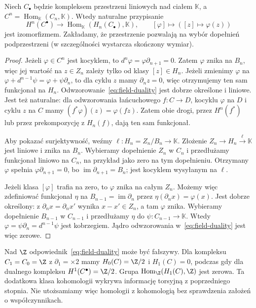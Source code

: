 \begin{twierdzenie}
\label{thm:field-hom-dual}
Niech $C_\bullet$ będzie kompleksem
przestrzeni liniowych nad ciałem
$\mathbb K$, a
$C^n=\operatorname{Hom}_{\mathbb K}(C_n,\mathbb K)$.
Wtedy naturalne przypisanie
\begin{equation}\label{eq:field-duality}
 H^n(C^\bullet)
 \longrightarrow\operatorname{Hom}_{\mathbb K}
  (H_n(C_\bullet),\mathbb K),
 \qquad [\varphi]\longmapsto
     ([z]\longmapsto\varphi(z))
\end{equation}
jest izomorfizmem. Zakładamy, że
przestrzenie pozwalają na wybór
dopełnień podprzestrzeni
(w szczególności wystarcza skończony wymiar).
\end{twierdzenie}
\begin{proof}
Jeżeli $\varphi\in C^n$ jest kocyklem,
to $d^n\varphi=\varphi \partial_{n+1}=0$.
Zatem $\varphi$ znika na $B_n$,
więc jej wartość na $z\in Z_n$
zależy tylko od klasy $[z]\in H_n$.
Jeżeli zmienimy $\varphi$ na
$\varphi+d^{n-1}\psi
=\varphi+\psi \partial_n$, to dla cyklu $z$
mamy $\partial_nz=0$, więc otrzymujemy
ten sam funkcjonał na $H_n$.
Odwzorowanie~\eqref{eq:field-duality} jest
dobrze określone i liniowe. Jest też naturalne: dla odwzorowania
łańcuchowego $f:C\to D$, kocyklu $\varphi$ na $D$ i cyklu $z$ na $C$
mamy $(f^*\varphi)(z)=\varphi(fz)$. Zatem obie drogi, przez
$H^n(f^*)$ lub przez prekompozycję z $H_n(f)$, dają ten sam funkcjonał.

Aby pokazać surjektywność, weźmy
$\ell:H_n=Z_n/B_n\to\mathbb K$.
Złożenie $Z_n\to H_n\xrightarrow{\ell}\mathbb K$
jest liniowe i znika na $B_n$.
Wybieramy dopełnienie $Z_n$ w $C_n$
i przedłużamy funkcjonał liniowo
na $C_n$, na przykład jako zero
na tym dopełnieniu. Otrzymany
$\varphi$ spełnia
$\varphi \partial_{n+1}=0$, bo
$\operatorname{im}\partial_{n+1}=B_n$;
jest kocyklem wysyłanym na $\ell$.

Jeżeli klasa $[\varphi]$ trafia na zero,
to $\varphi$ znika na całym $Z_n$.
Możemy więc zdefiniować funkcjonał
$\eta$ na $B_{n-1}=\operatorname{im}\partial_n$
przez $\eta(\partial_nx)=\varphi(x)$.
Jest dobrze określony: z
$\partial_nx=\partial_nx'$ wynika $x-x'\in Z_n$,
a tam $\varphi$ znika.
Wybieramy dopełnienie $B_{n-1}$
w $C_{n-1}$ i przedłużamy $\eta$
do $\psi:C_{n-1}\to\mathbb K$.
Wtedy $\varphi=\psi \partial_n=d^{n-1}\psi$
jest kobrzegiem. Jądro odwzorowania
w~\eqref{eq:field-duality} jest więc zerowe.
\end{proof}

\begin{uwaga}
Nad $\Z$ odpowiednik~\eqref{eq:field-duality}
może być fałszywy. Dla kompleksu
$C_1=C_0=\Z$ z $\partial_1=\times2$ mamy
$H_0(C)=\Z/2$ i $H_1(C)=0$,
podczas gdy dla dualnego kompleksu
$H^1(C^\bullet)=\Z/2$.
Grupa $\operatorname{Hom}_{\Z}
(H_1(C),\Z)$ jest zerowa.
Ta dodatkowa klasa kohomologii
wykrywa informację torsyjną z
poprzedniego stopnia. Nie utożsamiamy
więc homologii z kohomologią bez
sprawdzenia założeń o współczynnikach.
\end{uwaga}
